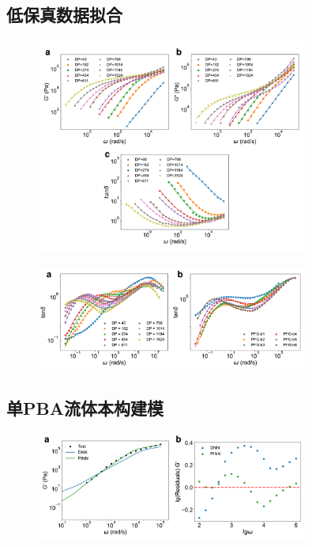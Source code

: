 \subsection{低保真数据拟合}
\begin{figure}[htbp]
  \centering
  \includegraphics[width=0.8\textwidth]{Fig/pba-LF.pdf}
\end{figure}
\begin{figure}[htbp]
  \centering
  \includegraphics[width=0.8\textwidth]{Fig/pfgs-LF.pdf}
\end{figure}
\subsection{单PBA流体本构建模}
\begin{figure}[htbp]
  \centering
  \includegraphics[width=0.8\textwidth]{Fig/pba-g1.pdf}
\end{figure}

